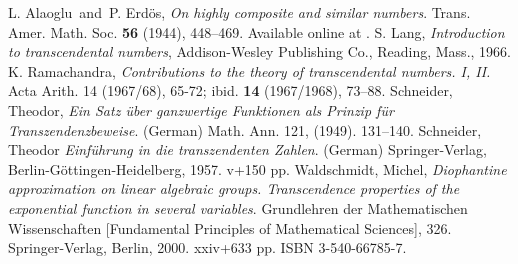 \documentclass[12pt]{article}
\begin{document}
\begin{thebibliography}{9}
     L. Alaoglu\ and\ P. Erd\"os, {\em On highly composite and similar numbers}.
        Trans. Amer. Math. Soc.
        {\bf 56} (1944), 448--469. Available online at
        .
     S. Lang, {\em Introduction to transcendental numbers},
        Addison-Wesley Publishing Co.,
        Reading, Mass., 1966.
     K. Ramachandra,
        {\em Contributions to the theory of transcendental numbers. I, II.}
        Acta Arith. 14 (1967/68), 65-72;
        ibid. {\bf 14} (1967/1968), 73--88.
     Schneider, Theodor,
        {\em Ein Satz \"{u}ber ganzwertige Funktionen als Prinzip f\"{u}r Transzendenzbeweise}.
         (German) Math. Ann. 121, (1949). 131--140.
     Schneider, Theodor
        {\em Einf\"{u}hrung in die transzendenten Zahlen}.
        (German) Springer-Verlag, Berlin-G\"{o}ttingen-Heidelberg, 1957. v+150 pp.
     Waldschmidt, Michel, {\em Diophantine approximation on linear algebraic groups.
        Transcendence
        properties of the exponential function in several variables}. Grundlehren der Mathematischen
        Wissenschaften
        [Fundamental Principles of Mathematical Sciences], 326. Springer-Verlag, Berlin, 2000. xxiv+633 pp.
        ISBN 3-540-66785-7.
\end{thebibliography}
\end{document}
